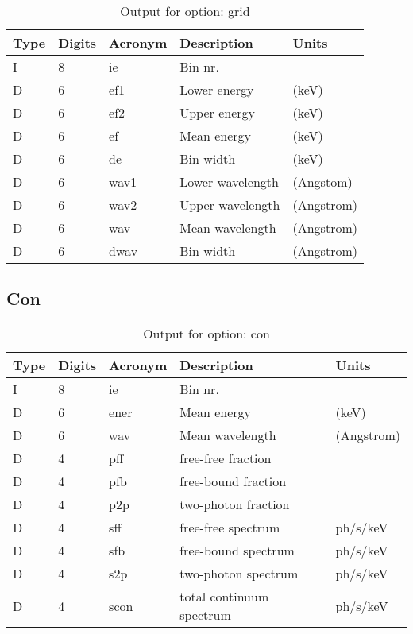 \begin{table}[!p]
\caption{Output for option: grid}
\label{tabout:grid}
\begin{tabular}{lllll}
\hline
Type & Digits & Acronym & Description & Units \\ 
\hline
I &  8 & ie   & Bin nr.                          &                  \\
D &  6 & ef1  & Lower energy                     & (keV)            \\
D &  6 & ef2  & Upper energy                     & (keV)            \\
D &  6 & ef   & Mean energy                      & (keV)            \\
D &  6 & de   & Bin width                        & (keV)            \\
D &  6 & wav1 & Lower wavelength                 & (Angstom)        \\
D &  6 & wav2 & Upper wavelength                 & (Angstrom)       \\
D &  6 & wav  & Mean wavelength                  & (Angstrom)       \\
D &  6 & dwav & Bin width                        & (Angstrom)       \\
\hline
\end{tabular}
\end{table}

\subsection{Con}

\begin{table}[!p]
\caption{Output for option: con}
\label{tabout:con}
\begin{tabular}{lllll}
\hline
Type & Digits & Acronym & Description & Units \\ 
\hline
I &  8 & ie   & Bin nr.                          &                  \\
D &  6 & ener & Mean energy                      & (keV)            \\
D &  6 & wav  & Mean wavelength                  & (Angstrom)       \\
D &  4 & pff  & free-free fraction               &                  \\
D &  4 & pfb  & free-bound fraction              &                  \\
D &  4 & p2p  & two-photon fraction              &                  \\
D &  4 & sff  & free-free spectrum               & ph/s/keV         \\
D &  4 & sfb  & free-bound spectrum              & ph/s/keV         \\
D &  4 & s2p  & two-photon spectrum              & ph/s/keV         \\
D &  4 & scon & total continuum spectrum         & ph/s/keV         \\
\hline
\end{tabular}
\end{table}

